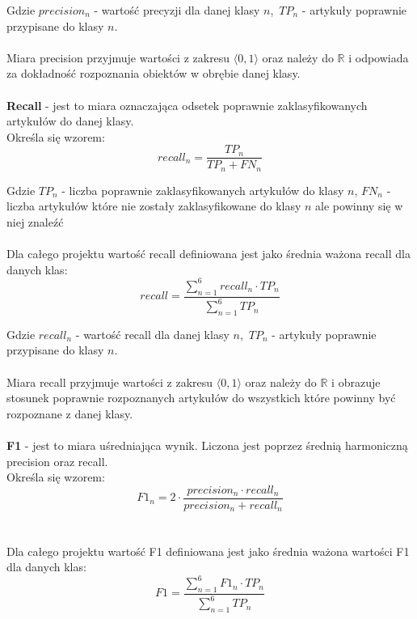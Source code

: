 \documentclass{classrep}
\begin{document}
Gdzie $precision_n$ - wartość precyzji dla danej klasy $n$,\, $TP_n$ - artykuły poprawnie przypisane do klasy $n$.
\\\\
Miara precision przyjmuje wartości z zakresu $\langle 0, 1\rangle$ oraz należy do $\mathbb{R}$ i odpowiada za dokładność rozpoznania obiektów w obrębie danej klasy.
\\\\

{\bf Recall} - jest to miara oznaczająca odsetek poprawnie zaklasyfikowanych artykułów do danej klasy.\\
Określa się wzorem:
\begin{equation}\label{recall}
recall_n = \frac{TP_n}{TP_n + FN_n}
\end{equation}

Gdzie $TP_n$ - liczba poprawnie zaklasyfikowanych artykułów do klasy $n$, $FN_n$ - liczba artykułów które nie zostały zaklasyfikowane do klasy $n$ ale powinny się w niej znaleźć
\\\\
Dla całego projektu wartość recall definiowana jest jako średnia ważona recall dla danych klas:
\begin{equation}
    recall = \frac{\sum_{n=1}^{6}recall_n \cdot TP_n}{\sum_{n=1}^{6}TP_n}
\end{equation}

Gdzie $recall_n$ - wartość recall dla danej klasy $n$,\, $TP_n$ - artykuły poprawnie przypisane do klasy $n$.
\\\\
Miara recall przyjmuje wartości z zakresu $\langle 0, 1\rangle$ oraz należy do $\mathbb{R}$ i obrazuje stosunek poprawnie rozpoznanych artykułów do wszystkich które powinny być rozpoznane z danej klasy.
\\\\

{\bf F1} - jest to miara uśredniająca wynik. Liczona jest poprzez średnią harmoniczną precision oraz recall.\\
Określa się wzorem:
\begin{equation}\label{F1}
F1_n = 2 \cdot  \frac{precision_n \cdot recall_n}{precision_n + recall_n}
\end{equation}
\\\\
Dla całego projektu wartość F1 definiowana jest jako średnia ważona wartości F1 dla danych klas:
\begin{equation}
    F1 = \frac{\sum_{n=1}^{6}F1_n \cdot TP_n}{\sum_{n=1}^{6}TP_n}
\end{equation}
\end{document}
